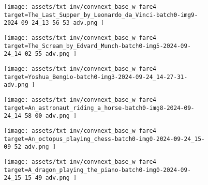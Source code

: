 \begin{figure*}[t]
    \vspace{1mm}
    \begin{minipage}[t]{.025\textwidth}
         \vspace{9mm}
    \end{minipage}%
    \begin{minipage}[t]{.98\textwidth}
        \vspace{0pt}
            \begin{subfigure}[t]{0.16\textwidth}
                    \texttt{[image:  assets/txt-inv/convnext\_base\_w-fare4-target=The\_Last\_Supper\_by\_Leonardo\_da\_Vinci-batch0-img9-2024-09-24\_13-56-53-adv.png ]}
            \end{subfigure}%
                \hspace{0.5mm}%
            \begin{subfigure}[t]{0.16\textwidth}
                    \texttt{[image:  assets/txt-inv/convnext\_base\_w-fare4-target=The\_Scream\_by\_Edvard\_Munch-batch0-img5-2024-09-24\_14-02-55-adv.png ]}
            \end{subfigure}%
                \hspace{0.5mm}%
            \begin{subfigure}[t]{0.16\textwidth}
                    \texttt{[image:  assets/txt-inv/convnext\_base\_w-fare4-target=Yoshua\_Bengio-batch0-img3-2024-09-24\_14-27-31-adv.png ]}
            \end{subfigure}%
                \hspace{0.5mm}%
            \begin{subfigure}[t]{0.16\textwidth}
                    \texttt{[image:  assets/txt-inv/convnext\_base\_w-fare4-target=An\_astronaut\_riding\_a\_horse-batch0-img8-2024-09-24\_14-58-00-adv.png ]}
            \end{subfigure}%
                \hspace{0.5mm}%
            \begin{subfigure}[t]{0.16\textwidth}
                    \texttt{[image:  assets/txt-inv/convnext\_base\_w-fare4-target=An\_octopus\_playing\_chess-batch0-img0-2024-09-24\_15-09-52-adv.png ]}
            \end{subfigure}%
                \hspace{0.5mm}%
            \begin{subfigure}[t]{0.16\textwidth}
                    \texttt{[image:  assets/txt-inv/convnext\_base\_w-fare4-target=A\_dragon\_playing\_the\_piano-batch0-img0-2024-09-24\_15-15-49-adv.png ]}
            \end{subfigure}%
    \end{minipage}


\end{figure*}
